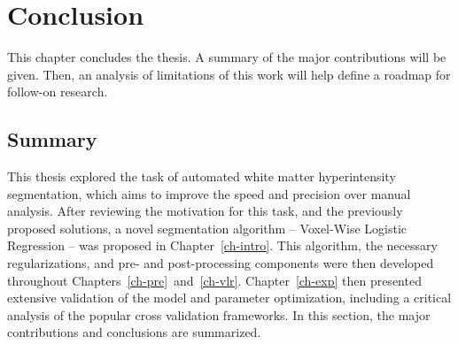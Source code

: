 \chapter{Conclusion}\label{ch-conc}
This chapter concludes the thesis.
A summary of the major contributions will be given.
Then, an analysis of limitations of this work will help define
a roadmap for follow-on research.
\section{Summary}
This thesis explored the task of automated white matter hyperintensity segmentation,
which aims to improve the speed and precision over manual analysis.
After reviewing the motivation for this task,
and the previously proposed solutions,
a novel segmentation algorithm -- Voxel-Wise Logistic Regression --
was proposed in Chapter~\ref{ch-intro}.
This algorithm, the necessary regularizations, and pre- and post-processing components
were then developed throughout Chapters~\ref{ch-pre}~and~\ref{ch-vlr}.
Chapter~\ref{ch-exp} then presented extensive validation of
the model and parameter optimization,
including a critical analysis of the popular cross validation frameworks.
In this section, the major contributions and conclusions are summarized.
